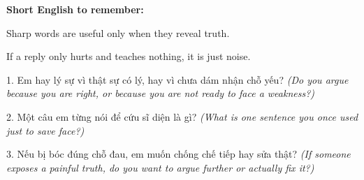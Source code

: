 \begin{ghinhoanh}
\textbf{Short English to remember:}

Sharp words are useful only when they reveal truth.

If a reply only hurts and teaches nothing, it is just noise.
\end{ghinhoanh}

\begin{tuhocnhanh}
1. Em hay lý sự vì thật sự có lý, hay vì chưa dám nhận chỗ yếu? \textit{(Do you argue because you are right, or because you are not ready to face a weakness?)}

2. Một câu em từng nói để cứu sĩ diện là gì? \textit{(What is one sentence you once used just to save face?)}

3. Nếu bị bóc đúng chỗ đau, em muốn chống chế tiếp hay sửa thật? \textit{(If someone exposes a painful truth, do you want to argue further or actually fix it?)}
\end{tuhocnhanh}

\ngancach